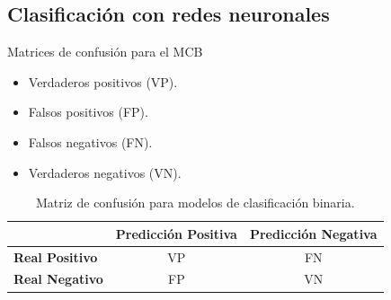 \subsection{Clasificación con redes neuronales}
\begin{frame}{Matrices de confusión para el MCB}
\begin{itemize}
	\item \small Verdaderos positivos (VP).
    \item \small Falsos positivos (FP).
    \item \small Falsos negativos (FN).
    \item \small Verdaderos negativos (VN).
\end{itemize}

\begin{table}[H]
\centering
\begin{tabular}{|l|c|c|}
\hline
 & \textbf{Predicción Positiva} & \textbf{Predicción Negativa} \\ \hline
\textbf{Real Positivo} & VP & FN \\ \hline
\textbf{Real Negativo} & FP & VN \\ \hline
\end{tabular}
\caption{Matriz de confusión para modelos de clasificación binaria.}
\label{tab:confusion_matrix}
\end{table}

\scriptsize
{}






\end{frame}

